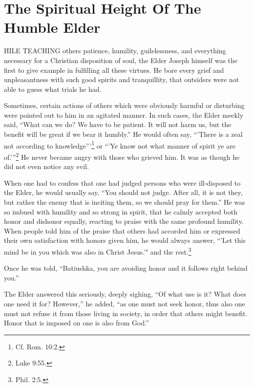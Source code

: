 \chapter{The Spiritual Height Of The Humble Elder}
HILE TEACHING others patience, humility, guilelessness, and everything necessary for a Christian disposition of soul, the Elder Joseph himself was the first to give example in fulfilling all these virtues. He bore every grief and unpleasantness with such good spirits and tranquillity, that outsiders were not able to guess what trials he had.

Sometimes, certain actions of others which were obviously harmful or disturbing were pointed out to him in an agitated manner. In such cases, the Elder meekly said, “What can we do? We have to be patient. It will not harm us, but the benefit will be great if we bear it humbly.” He would often say, ``'There is a zeal not according to knowledge'''\footnote{Cf. Rom. 10:2.} or “'Ye know not what manner of spirit ye are of.'”\footnote{Luke 9:55.} He never became angry with those who grieved him. It was as though he did not even notice any evil.

When one had to confess that one had judged persons who were ill-disposed to the Elder, he would usually say, “You should not judge. After all, it is not they, but rather the enemy that is inciting them, so we should pray for them.” He was so imbued with humility and so strong in spirit, that he calmly accepted both honor and dishonor equally, reacting to praise with the same profound humility. When people told him of the praise that others had accorded him or expressed their own satisfaction with honors given him, he would always answer, “'Let this mind be in you which was also in Christ Jesus.'" and the rest.\footnote{Phil. 2:5.}

Once he was told, “Batiushka, you are avoiding honor and it follows right behind you.”

The Elder answered this seriously, deeply sighing, “Of what use is it? What does one need it for? However,” he added, “as one must not seek honor, thus also one must not refuse it from those living in society, in order that others might benefit. Honor that is imposed on one is also from God.”

